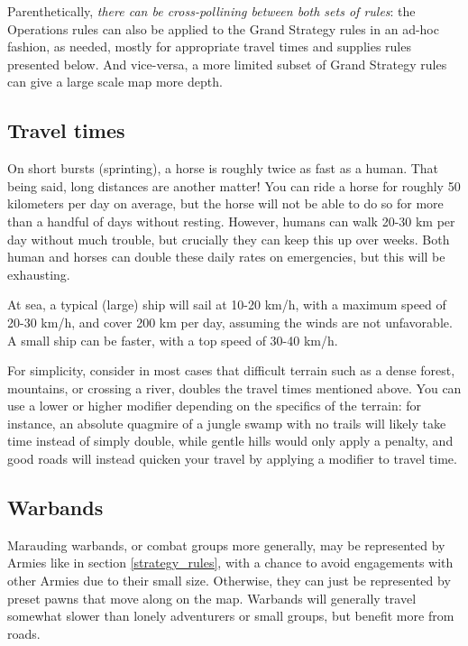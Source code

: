 Parenthetically, \textit{there can be cross-pollining between both sets of rules}: the Operations rules can also be applied to the Grand Strategy rules in an ad-hoc fashion, as needed, mostly for appropriate travel times and supplies rules presented below. And vice-versa, a more limited subset of Grand Strategy rules can give a large scale map more depth.


\subsection{Travel times}

On short bursts (sprinting), a horse is roughly twice as fast as a human. That being said, long distances are another matter! You can ride a horse for roughly 50 kilometers per day on average, but the horse will not be able to do so for more than a handful of days without resting. However, humans can walk 20-30 km per day without much trouble, but crucially they can keep this up over weeks. Both human and horses can double these daily rates on emergencies, but this will be exhausting.

At sea, a typical (large) ship will sail at 10-20 km/h, with a maximum speed of 20-30 km/h, and cover 200 km per day, assuming the winds are not unfavorable. A small ship can be faster, with a top speed of 30-40 km/h.

For simplicity, consider in most cases that difficult terrain such as a dense forest, mountains, or crossing a river, doubles the travel times mentioned above. You can use a lower or higher modifier depending on the specifics of the terrain: for instance, an absolute quagmire of a jungle swamp with no trails will likely take  time instead of simply double, while gentle hills would only apply a  penalty, and good roads will instead quicken your travel by applying a  modifier to travel time.

\subsection{Warbands}

Marauding warbands, or combat groups more generally, may be represented by Armies like in section \ref{strategy_rules}, with a chance to avoid engagements with other Armies due to their small size. Otherwise, they can just be represented by preset pawns that move along on the map. Warbands will generally travel somewhat slower than lonely adventurers or small groups, but benefit more from roads.

